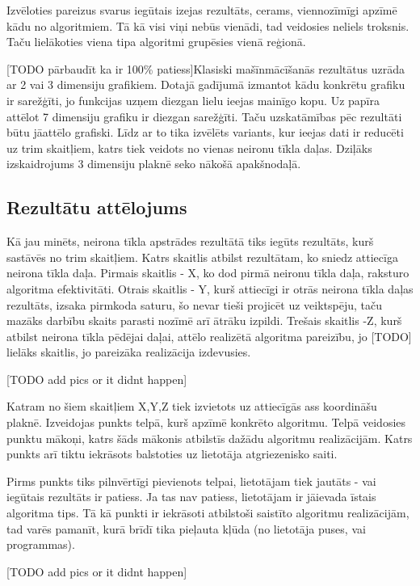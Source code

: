 Izvēloties pareizus svarus iegūtais izejas rezultāts, cerams, viennozīmīgi apzīmē kādu no algoritmiem. Tā kā visi viņi nebūs vienādi, tad veidosies neliels troksnis. Taču lielākoties viena tipa algoritmi grupēsies vienā reģionā.

[TODO pārbaudīt ka ir 100\% patiess]Klasiski mašīnmācīšanās rezultātus uzrāda ar 2 vai 3 dimensiju grafikiem. Dotajā gadījumā izmantot kādu konkrētu grafiku ir sarežģīti, jo funkcijas uzņem diezgan lielu ieejas mainīgo kopu. Uz papīra attēlot 7 dimensiju grafiku ir diezgan sarežģīti. Taču uzskatāmības pēc rezultāti būtu jāattēlo grafiski. Līdz ar to tika izvēlēts variants, kur ieejas dati ir reducēti uz trim skaitļiem, katrs tiek veidots no vienas neironu tīkla daļas. Dziļāks izskaidrojums 3 dimensiju plaknē seko nākošā apakšnodaļā. 

\subsection{Rezultātu attēlojums}
Kā jau minēts, neirona tīkla apstrādes rezultātā tiks iegūts rezultāts, kurš sastāvēs no trim skaitļiem. Katrs skaitlis atbilst rezultātam, ko sniedz attiecīga neirona tīkla daļa. Pirmais skaitlis - X, ko dod pirmā neironu tīkla daļa, raksturo algoritma efektivitāti. Otrais skaitlis - Y, kurš attiecīgi ir otrās neirona tīkla daļas rezultāts, izsaka pirmkoda saturu, šo nevar tieši projicēt uz veiktspēju, taču mazāks darbību skaits parasti nozīmē arī ātrāku izpildi. Trešais skaitlis -Z, kurš atbilst neirona tīkla pēdējai daļai, attēlo realizētā algoritma pareizību, jo [TODO] lielāks skaitlis, jo pareizāka realizācija izdevusies.

[TODO add pics or it didnt happen]

Katram no šiem skaitļiem X,Y,Z tiek izvietots uz attiecīgās ass koordināšu plaknē. Izveidojas punkts telpā, kurš apzīmē konkrēto algoritmu. Telpā veidosies punktu mākoņi, katrs šāds mākonis atbilstīs dažādu algoritmu realizācijām. Katrs punkts arī tiktu iekrāsots balstoties uz lietotāja atgriezenisko saiti. 

Pirms punkts tiks pilnvērtīgi pievienots telpai, lietotājam tiek jautāts - vai iegūtais rezultāts ir patiess. Ja tas nav patiess, lietotājam ir jāievada īstais algoritma tips. Tā kā punkti ir iekrāsoti atbilstoši saistīto algoritmu realizācijām, tad varēs pamanīt, kurā brīdī tika pieļauta kļūda (no lietotāja puses, vai programmas). 

[TODO add pics or it didnt happen]


